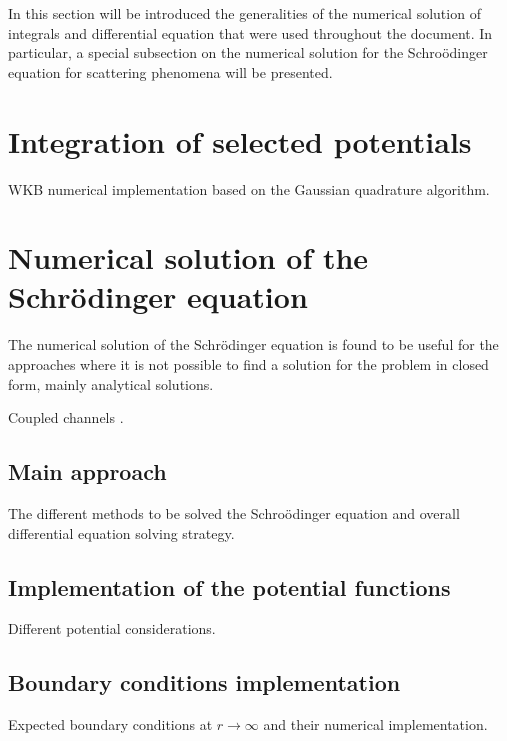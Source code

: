 \documentclass[openany]{book}
\begin{document}
In this section will be introduced the generalities of the numerical solution of integrals and differential equation that were used throughout the document. In particular, a special subsection on the numerical solution for the Schroödinger equation for scattering phenomena will be presented. 

\section{Integration of selected potentials} \label{sec:integrationPotentials}

WKB numerical implementation based on the Gaussian quadrature algorithm.


\section{Numerical solution of the Schrödinger equation} \label{sec:schrodingerSolution}

The numerical solution of the Schrödinger equation is found to be useful for the approaches where it is not possible to find a solution for the problem in closed form, mainly analytical solutions. 

\cite{salvat_fernandez-varea_2019}

Coupled channels \cite{hagino_rowley_kruppa_1999}.

\subsection{Main approach} \label{sub:diffSolvingMainApproach}

The different methods to be solved the Schroödinger equation and overall differential equation solving strategy. 

\subsection{Implementation of the potential functions} \label{sub:diffSolvingPotential}

Different potential considerations. 

\subsection{Boundary conditions implementation} \label{sub:diffSolvingBoundaries}

Expected boundary conditions at $r \rightarrow \infty$ and their numerical implementation.
\end{document}

